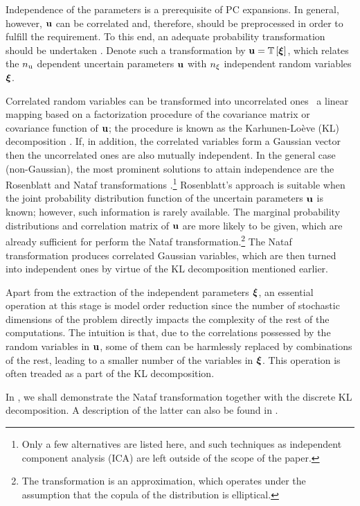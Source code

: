 Independence of the parameters is a prerequisite of PC expansions.
In general, however, $\mathbf{u}$ can be correlated and, therefore, should be preprocessed in order to fulfill the requirement.
To this end, an adequate probability transformation should be undertaken \cite{eldred2008}.
Denote such a transformation by $\vU = \oTransform{\vZ}$, which relates the ${n_\text{u}}$ dependent uncertain parameters $\mathbf{u}$ with ${n_\xi}$ independent random variables $\boldsymbol{\xi}$.

Correlated random variables can be transformed into uncorrelated ones \via\ a linear mapping based on a factorization procedure of the covariance matrix or covariance function of $\mathbf{u}$; the procedure is known as the Karhunen-Lo\`{e}ve (KL) decomposition \cite{ghanem1991}.
If, in addition, the correlated variables form a Gaussian vector then the uncorrelated ones are also mutually independent.
In the general case (non-Gaussian), the most prominent solutions to attain independence are the Rosenblatt \cite{rosenblatt1952} and Nataf transformations \cite{li2008}.\footnote{Only a few alternatives are listed here, and such techniques as independent component analysis (ICA) are left outside of the scope of the paper.}
Rosenblatt's approach is suitable when the joint probability distribution function of the uncertain parameters $\mathbf{u}$ is known; however, such information is rarely available.
The marginal probability distributions and correlation matrix of $\mathbf{u}$ are more likely to be given, which are already sufficient for perform the Nataf transformation.\footnote{The transformation is an approximation, which operates under the assumption that the copula of the distribution is elliptical.}
The Nataf transformation produces correlated Gaussian variables, which are then turned into independent ones by virtue of the KL decomposition mentioned earlier.

Apart from the extraction of the independent parameters $\boldsymbol{\xi}$, an essential operation at this stage is model order reduction since the number of stochastic dimensions of the problem directly impacts the complexity of the rest of the computations.
The intuition is that, due to the correlations possessed by the random variables in $\mathbf{u}$, some of them can be harmlessly replaced by combinations of the rest, leading to a smaller number of the variables in $\boldsymbol{\xi}$.
This operation is often treaded as a part of the KL decomposition.

In , we shall demonstrate the Nataf transformation together with the discrete KL decomposition.
A description of the latter can also be found in .
